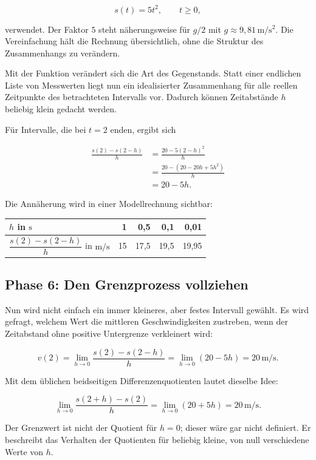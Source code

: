 \documentclass[11pt,a4paper]{article}
\begin{document}
\[
  s(t)=5t^2,\qquad t\geq 0,
\]

verwendet. Der Faktor $5$ steht näherungsweise für $g/2$ mit
$g\approx 9{,}81\,\mathrm{m/s^2}$. Die Vereinfachung hält die Rechnung
übersichtlich, ohne die Struktur des Zusammenhangs zu verändern.

Mit der Funktion verändert sich die Art des Gegenstands. Statt einer endlichen
Liste von Messwerten liegt nun ein idealisierter Zusammenhang für alle reellen
Zeitpunkte des betrachteten Intervalls vor. Dadurch können Zeitabstände $h$
beliebig klein gedacht werden.

Für Intervalle, die bei $t=2$ enden, ergibt sich

\begin{align*}
  \frac{s(2)-s(2-h)}{h}
  &=\frac{20-5(2-h)^2}{h}\\
  &=\frac{20-(20-20h+5h^2)}{h}\\
  &=20-5h.
\end{align*}

Die Annäherung wird in einer Modellrechnung sichtbar:

\begin{center}
\begin{tabular}{@{}lrrrr@{}}
\toprule
$h$ in $\mathrm{s}$ & 1 & 0{,}5 & 0{,}1 & 0{,}01 \\
\midrule
$\dfrac{s(2)-s(2-h)}{h}$ in $\mathrm{m/s}$
  & 15 & 17{,}5 & 19{,}5 & 19{,}95 \\
\bottomrule
\end{tabular}
\end{center}

\subsection{Phase 6: Den Grenzprozess vollziehen}

Nun wird nicht einfach ein immer kleineres, aber festes Intervall gewählt. Es
wird gefragt, welchem Wert die mittleren Geschwindigkeiten zustreben, wenn der
Zeitabstand ohne positive Untergrenze verkleinert wird:

\[
  v(2)
  =\lim_{h\to 0}\frac{s(2)-s(2-h)}{h}
  =\lim_{h\to 0}(20-5h)
  =20\,\mathrm{m/s}.
\]

Mit dem üblichen beidseitigen Differenzenquotienten lautet dieselbe Idee:

\[
  \lim_{h\to 0}\frac{s(2+h)-s(2)}{h}
  =\lim_{h\to 0}(20+5h)
  =20\,\mathrm{m/s}.
\]

Der Grenzwert ist nicht der Quotient für $h=0$; dieser wäre gar nicht definiert.
Er beschreibt das Verhalten der Quotienten für beliebig kleine, von null
verschiedene Werte von $h$.
\end{document}
